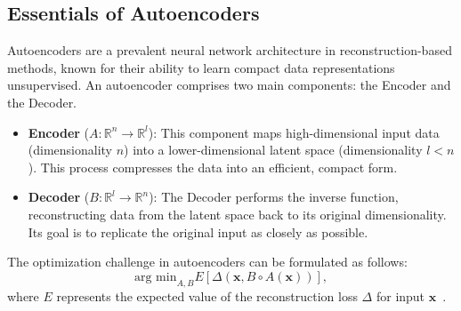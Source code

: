 \subsection{Essentials of Autoencoders}
Autoencoders are a prevalent neural network architecture in reconstruction-based methods, known for their ability to learn compact data representations unsupervised. An autoencoder comprises two main components: the Encoder and the Decoder.\\
\begin{itemize}
  \item \textbf{Encoder} ($A:\mathbb{R}^n \rightarrow{} \mathbb{R}^l$): This component maps high-dimensional input data (dimensionality $n$) into a lower-dimensional latent space (dimensionality $l<n$). This process compresses the data into an efficient, compact form.
  \item \textbf{Decoder} ($B:\mathbb{R}^l \rightarrow{} \mathbb{R}^n$): The Decoder performs the inverse function, reconstructing data from the latent space back to its original dimensionality. Its goal is to replicate the original input as closely as possible.
\end{itemize}
The optimization challenge in autoencoders can be formulated as follows:
\[ \text{arg min}_{A,B}E[\Delta (\mathbf{x}, B \circ A(\mathbf{x}))], \]
where $E$ represents the expected value of the reconstruction loss $\Delta$ for input $\mathbf{x}$~\cite{bank2023autoencoders}.



